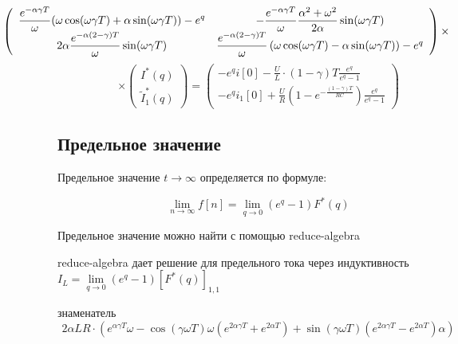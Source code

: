 \documentclass[a4paper,12pt]{article}
\begin{document}
$$
\hspace{-2cm}
\left(
\begin{array}{cc}
{\displaystyle \frac{e^{-\alpha\gamma T}}{\omega}(\omega\cos(\omega\gamma T) + \alpha\sin(\omega\gamma T)) - e^q}
&
{\displaystyle -\frac{e^{-\alpha\gamma T}}{\omega}\frac{\alpha^2+\omega^2}{2\alpha}\sin(\omega\gamma T)}\\
	{\displaystyle 2\alpha\frac{e^{-\alpha(2-\gamma)T}}{\omega}\sin(\omega\gamma T)}
&
        {\displaystyle \frac{e^{-\alpha(2-\gamma)T}}{\omega}
        \left( \omega\cos(\omega\gamma T) - \alpha \sin(\omega\gamma T)\right)} - e^q
\end{array}
\right)\times
$$
\begin{equation}
\times\left(
\begin{array}{c}
I^*(q)\\
\tilde{I}_1^*(q)
\end{array}
\right)=
\left(
\begin{array}{c}
        {\displaystyle - e^qi[0] - \frac{U}{L}\cdot(1-\gamma)T
        \frac{e^q}{e^q - 1}} \\[2.2mm]
{\displaystyle - e^q i_1[0] +
        \frac{U}{R}\left(1- e^{-\frac{(1-\gamma)T}{RC}} \right) \frac{e^q}{e^q-1}}
\end{array}
\right)
\end{equation}

\subsection{Предельное значение}

Предельное значение $t\rightarrow \infty$ определяется по формуле:

\begin{equation}
\lim_{n\rightarrow \infty} f[n] =\lim_{q\rightarrow 0} (e^q -1) F^*(q)
\end{equation}


Предельное значение можно найти с помощью reduce-algebra


reduce-algebra дает решение для предельного тока через индуктивность 
$I_L = \lim\limits_{q\rightarrow 0} (e^q -1) \left[F^*(q)\right]_{1,1}$





знаменатель
$$
2\alpha L R\cdot(e^{\alpha\gamma T}\omega - \cos(\gamma\omega T)\omega 
\left( e^{2\alpha\gamma T} + e^{2\alpha T}\right)
+\sin(\gamma\omega T)\left( e^{2\alpha\gamma T} - e^{2\alpha T}\right)\alpha)
$$
\end{document}
